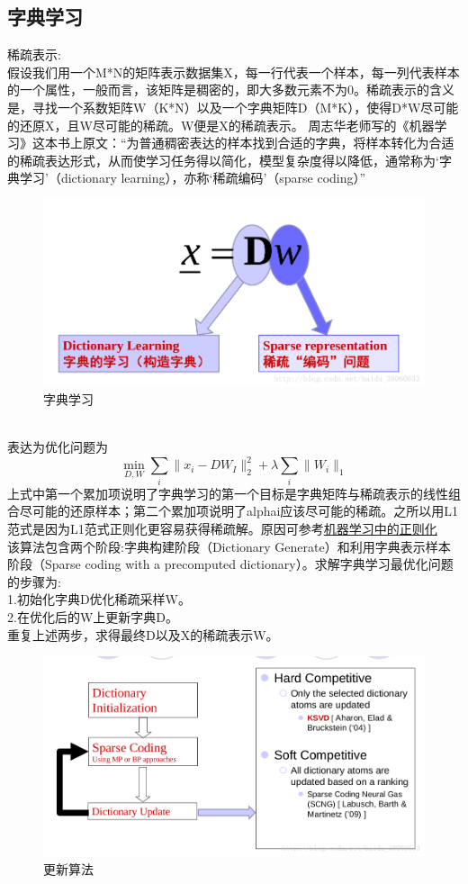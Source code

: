 \documentclass{article}
\begin{document}
\subsection{字典学习}
稀疏表示:\\
假设我们用一个M*N的矩阵表示数据集X，每一行代表一个样本，每一列代表样本的一个属性，一般而言，该矩阵是稠密的，即大多数元素不为0。稀疏表示的含义是，寻找一个系数矩阵W（K*N）以及一个字典矩阵D（M*K），使得D*W尽可能的还原X，且W尽可能的稀疏。W便是X的稀疏表示。
周志华老师写的《机器学习》这本书上原文：“为普通稠密表达的样本找到合适的字典，将样本转化为合适的稀疏表达形式，从而使学习任务得以简化，模型复杂度得以降低，通常称为‘字典学习’（dictionary learning），亦称‘稀疏编码’（sparse coding）”
\begin{figure}[h]
\centering
\includegraphics[height=0.4\linewidth]{9.png}
\caption{字典学习}
\end{figure}\\
表达为优化问题为
\begin{equation}
\min_{D,W} \sum_i \parallel x_i-DW_I \parallel_2^2+\lambda \sum_i \parallel W_i \parallel_1  \tag{5.1.1}
\end{equation}
上式中第一个累加项说明了字典学习的第一个目标是字典矩阵与稀疏表示的线性组合尽可能的还原样本；第二个累加项说明了alphai应该尽可能的稀疏。之所以用L1范式是因为L1范式正则化更容易获得稀疏解。原因可参考\href{https://blog.csdn.net/zouxy09/article/details/24971995/}{机器学习中的正则化}\\
该算法包含两个阶段:字典构建阶段（Dictionary Generate）和利用字典表示样本阶段（Sparse coding with a precomputed dictionary）。求解字典学习最优化问题的步骤为:\\
1.初始化字典D优化稀疏采样W。\\ 
2.在优化后的W上更新字典D。\\ 
重复上述两步，求得最终D以及X的稀疏表示W。\\
\begin{figure}[h]
\centering
\includegraphics[height=0.4\linewidth]{10.png}
\caption{更新算法}
\end{figure}\\
\end{document}
